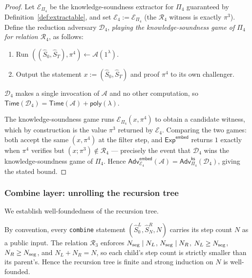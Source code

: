 \begin{proof}
Let $\mathcal{E}_{\Pi_4}$ be the knowledge-soundness extractor for $\Pi_4$
guaranteed by Definition~\ref{def:extractable}, and set
$\mathcal{E}_4 := \mathcal{E}_{\Pi_4}$ (the $\mathcal{R}_4$ witness is exactly
$\pi^3$). Define the reduction adversary $\mathcal{D}_4$, \emph{playing the
knowledge-soundness game of $\Pi_4$ for relation $\mathcal{R}_4$}, as follows:
\begin{enumerate}
  \item Run $((\hat{S}_0,\hat{S}_T),\pi^4)\leftarrow\mathcal{A}(1^\lambda)$.
  \item Output the statement $x:=(\hat{S}_0,\hat{S}_T)$ and proof $\pi^4$ to its
    own challenger.
\end{enumerate}
$\mathcal{D}_4$ makes a single invocation of $\mathcal{A}$ and no other
computation, so
$\mathsf{Time}(\mathcal{D}_4)=\mathsf{Time}(\mathcal{A})+\mathsf{poly}(\lambda)$.

The knowledge-soundness game runs $\mathcal{E}_{\Pi_4}(x,\pi^4)$ to obtain a
candidate witness, which by construction is the value $\pi^3$ returned by
$\mathcal{E}_4$. Comparing the two games: both accept the same $(x,\pi^4)$ at
the filter step, and $\mathsf{Exp}^{\mathsf{embed}}$ returns $1$ exactly when
$\pi^4$ verifies but $(x;\pi^3)\notin\mathcal{R}_4$ --- precisely the event that
$\mathcal{D}_4$ wins the knowledge-soundness game of $\Pi_4$. Hence
$\mathsf{Adv}^{\mathsf{embed}}_{\mathcal{E}_4}(\mathcal{A})
=\mathsf{Adv}^{\mathsf{ks}}_{\Pi_4}(\mathcal{D}_4)$, giving the stated bound.
\end{proof}

\subsubsection{Combine layer: unrolling the recursion tree}\label{sec:lem:combine}

We establish well-foundedness of the recursion tree.

\begin{remark}\label{rem:wellfounded}
By convention, every \texttt{combine} statement $(\hat{S}_0^L, \hat{S}_N^R, N)$
carries its step count $N$ as a public input.
The relation $\mathcal{R}_3$ enforces $N_{{\mathrm{seg}}} \mid N_L$, $N_{{\mathrm{seg}}} \mid N_R$,
$N_L \geq N_{{\mathrm{seg}}}$, $N_R \geq N_{{\mathrm{seg}}}$, and $N_L+N_R=N$, so each child's
step count is strictly smaller than its parent's.
Hence the recursion tree is finite and strong induction on $N$ is well-founded.
\end{remark}

